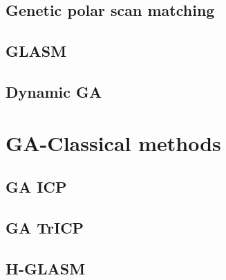 \documentclass[authoryearcitations]{UoYCSproject}
\begin{document}
\subsection{Genetic polar scan matching}
\subsection{GLASM}
\subsection{Dynamic GA}

\section{GA-Classical methods}
\subsection{GA ICP}
\subsection{GA TrICP}
\subsection{H-GLASM}
\cleardoublepage



\end{document}
